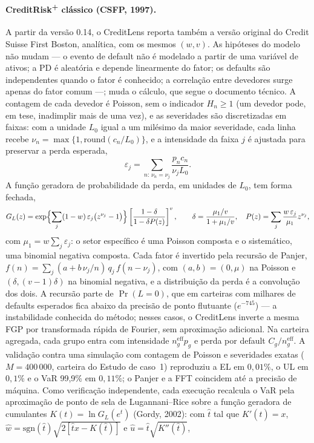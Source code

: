 \documentclass[11pt,a4paper]{article}
\begin{document}
\paragraph{CreditRisk\textsuperscript{+} clássico (CSFP, 1997).} A partir da versão 0.14, o CreditLens reporta também a versão original do Credit Suisse First Boston, analítica, com os mesmos $(w,v)$. As hipóteses do modelo não mudam --- o evento de default não é modelado a partir de uma variável de ativos; a PD é aleatória e depende linearmente do fator; os defaults são independentes quando o fator é conhecido; a correlação entre devedores surge apenas do fator comum ---; muda o cálculo, que segue o documento técnico. A contagem de cada devedor é Poisson, sem o indicador $H_n\ge1$ (um devedor pode, em tese, inadimplir mais de uma vez), e as severidades são discretizadas em faixas: com a unidade $L_0$ igual a um milésimo da maior severidade, cada linha recebe $\nu_n=\max\{1,\mathrm{round}(c_n/L_0)\}$, e a intensidade da faixa $j$ é ajustada para preservar a perda esperada,
\begin{equation}
\varepsilon_j=\sum_{n:\,\nu_n=\nu_j}\frac{p_n c_n}{\nu_j L_0}.
\end{equation}
A função geradora de probabilidade da perda, em unidades de $L_0$, tem forma fechada,
\begin{equation}\label{eq:crplus-fgp}
G_L(z)=\exp\Bigl\{\sum_j (1-w)\,\varepsilon_j\bigl(z^{\nu_j}-1\bigr)\Bigr\}\left[\frac{1-\delta}{1-\delta P(z)}\right]^{v},\qquad \delta=\frac{\mu_1/v}{1+\mu_1/v},\quad P(z)=\sum_j\frac{w\,\varepsilon_j}{\mu_1}z^{\nu_j},
\end{equation}
com $\mu_1=w\sum_j\varepsilon_j$: o setor específico é uma Poisson composta e o sistemático, uma binomial negativa composta. Cada fator é invertido pela recursão de Panjer, $f(n)=\sum_j(a+b\,\nu_j/n)\,q_j\,f(n-\nu_j)$, com $(a,b)=(0,\mu)$ na Poisson e $(\delta,(v-1)\delta)$ na binomial negativa, e a distribuição da perda é a convolução dos dois. A recursão parte de $\Pr(L=0)$, que em carteiras com milhares de defaults esperados fica abaixo da precisão de ponto flutuante ($e^{-745}$) --- a instabilidade conhecida do método; nesses casos, o CreditLens inverte a mesma FGP por transformada rápida de Fourier, sem aproximação adicional. Na carteira agregada, cada grupo entra com intensidade $n_g^{\mathrm{eff}}p_g$ e perda por default $C_g/n_g^{\mathrm{eff}}$. A validação contra uma simulação com contagem de Poisson e severidades exatas ($M=400\,000$, carteira do Estudo de caso~1) reproduziu a EL em $0{,}01\%$, o UL em $0{,}1\%$ e o VaR 99{,}9\% em $0{,}11\%$; o Panjer e a FFT coincidem até a precisão de máquina. Como verificação independente, cada execução recalcula o VaR pela aproximação de ponto de sela de Lugannani--Rice sobre a função geradora de cumulantes $K(t)=\ln G_L(e^t)$ (Gordy, 2002): com $\hat t$ tal que $K'(\hat t)=x$, $\hat w=\mathrm{sgn}(\hat t)\sqrt{2[\hat t x-K(\hat t)]}$ e $\hat u=\hat t\sqrt{K''(\hat t)}$,
\end{document}
